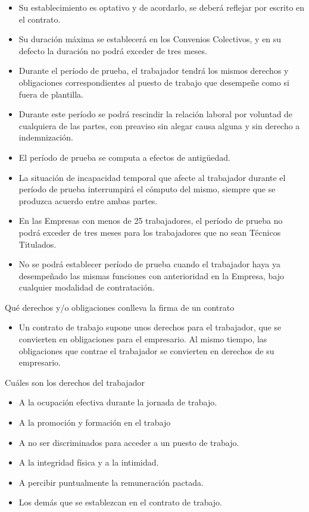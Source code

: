 \begin{itemize}
  \item Su establecimiento es optativo y de acordarlo, se deberá reflejar por escrito en el contrato.
  \item Su duración máxima se establecerá en los Convenios Colectivos, y en su defecto la duración no podrá exceder de tres meses.
  \item Durante el período de prueba, el trabajador tendrá los mismos derechos y obligaciones correspondientes al puesto de trabajo que desempeñe como si fuera de plantilla.
  \item Durante este período se podrá rescindir la relación laboral por voluntad de cualquiera de las partes, con preaviso sin alegar causa alguna y sin derecho a indemnización.
  \item El período de prueba se computa a efectos de antigüedad.
  \item La situación de incapacidad temporal que afecte al trabajador durante el período de prueba interrumpirá el cómputo del mismo, siempre que se produzca acuerdo entre ambas partes.
  \item En las Empresas con menos de 25 trabajadores, el período de prueba no podrá exceder de tres meses para los trabajadores que no sean Técnicos Titulados.
  \item No se podrá establecer período de prueba cuando el trabajador haya ya desempeñado las mismas funciones con anterioridad en la Empresa, bajo cualquier modalidad de contratación.
\end{itemize}
Qué derechos y/o obligaciones conlleva la firma de un contrato

\begin{itemize}
  \item Un contrato de trabajo supone unos derechos para el trabajador, que se convierten en obligaciones para el empresario. Al mismo tiempo, las obligaciones que contrae el trabajador se convierten en derechos de su empresario.
\end{itemize}
Cuáles son los derechos del trabajador

\begin{itemize}
  \item A la ocupación efectiva durante la jornada de trabajo.
  \item A la promoción y formación en el trabajo
  \item A no ser discriminados para acceder a un puesto de trabajo.
  \item A la integridad física y a la intimidad.
  \item A percibir puntualmente la remuneración pactada.
  \item Los demás que se establezcan en el contrato de trabajo.
\end{itemize}

